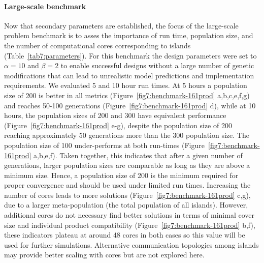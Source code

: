 \paragraph{Large-scale benchmark}
Now that secondary parameters are established, the focus of the large-scale problem benchmark is to asses the importance of run time, population size, and the number of computational cores corresponding to islands  (Table~\ref{tab7:parameters}).
For this benchmark the design parameters were set to $\alpha=10$ and $\beta=2$ to enable successful designs without a large number of genetic modifications that can lead to unrealistic model predictions and implementation requirements.  %
We evaluated 5 and 10 hour run times. At 5 hours a population size of 200 is better in all metrics (Figure~\ref{fig7:benchmark-161prod} a,b,c,e,f,g) and reaches 50-100 generations (Figure~\ref{fig7:benchmark-161prod} d), while at 10 hours, the population sizes of 200 and 300 have equivalent performance (Figure~\ref{fig7:benchmark-161prod} e-g), despite the population size of 200 reaching  approximately 50 generations more than the 300 population size.
The population size of 100 under-performs at both run-times (Figure~\ref{fig7:benchmark-161prod} a,b,e,f).
Taken together, this indicates that after a given number of generations, larger population sizes are comparable as long as they are above a minimum size.
Hence, a population size of 200 is the minimum required for proper convergence and should be used under limited run times.
Increasing the number of cores leads to more solutions (Figure~\ref{fig7:benchmark-161prod} c,g), due to a larger meta-population (the total population of all islands). However, additional cores do not necessary find better solutions in terms of minimal cover size and individual product compatibility
(Figure~\ref{fig7:benchmark-161prod} b,f), these indicators plateau at around 48 cores in both cases so this value will be used for further simulations.
Alternative communication topologies among islands \citep{hijaze2009} may provide better scaling with cores but are not explored here.


